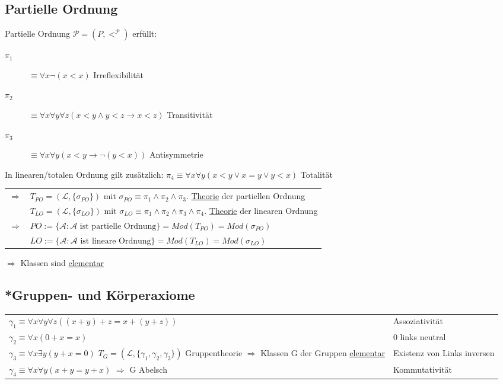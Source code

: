 \documentclass[12pt,a4paper]{article} %
\begin{document}
	\subsection{Partielle Ordnung}
	Partielle Ordnung $\mathcal{P} = (P, <^{\mathcal{P}})$ erfüllt:
	\begin{description}
		\item[$\pi_1$] $\equiv \forall x \neg(x < x)$ Irreflexibilität
		\item[$\pi_2$] $\equiv \forall x \forall y \forall z (x < y \land y < z \rightarrow x < z)$ Transitivität
		\item[$\pi_3$] $\equiv \forall x \forall y (x < y \rightarrow \neg (y < x))$ Antisymmetrie
	\end{description}
	In linearen/totalen Ordnung gilt zusätzlich:\newline
	$\pi_4 \equiv \forall x \forall y (x < y \lor x = y \lor y < x)$ Totalität
	
	\begin{tabular}{l l}
		$\Rightarrow$ & $T_{PO} = (\mathcal{L}, \{\sigma_{PO}\})$ mit $\sigma_{PO} \equiv \pi_1 \land \pi_2 \land \pi_3$. \hyperref[Theorie]{Theorie} der partiellen Ordnung \\
		& $T_{LO} = (\mathcal{L}, \{\sigma_{LO}\})$ mit $\sigma_{LO} \equiv \pi_1 \land \pi_2 \land \pi_3 \land \pi_4$. \hyperref[Theorie]{Theorie} der linearen Ordnung \\
		$\Rightarrow$ & $PO := \{\mathcal{A}: \mathcal{A} \text{ ist partielle Ordnung}\} = Mod(T_{PO}) = Mod(\sigma_{PO})$ \\
		& $LO := \{\mathcal{A}: \mathcal{A} \text{ ist lineare Ordnung}\} = Mod(T_{LO}) = Mod(\sigma_{LO})$
	\end{tabular}
	
	$\Rightarrow$ Klassen sind \hyperref[Elementar]{elementar}

	\subsection{*Gruppen- und Körperaxiome}
	\begin{tabular}{p{7cm} l}
		$\gamma_1 \equiv \forall x \forall y \forall z ((x + y) + z = x + (y + z))$ & Assoziativität \\
		$\gamma_2 \equiv \forall x (0 + x = x)$ & 0 links neutral \\
		$\gamma_3 \equiv \forall x \exists y (y + x = 0)$ \newline $T_G = (\mathcal{L}, \{\gamma_1, \gamma_2, \gamma_3\})$ Gruppentheorie \newline $\Rightarrow$ Klassen G der Gruppen \hyperref[Elementar]{elementar} & Existenz von Links inversen \\
		$\gamma_4 \equiv \forall x \forall y (x + y = y + x)$ \newline $\Rightarrow$ G Abelsch & Kommutativität \\
	\end{tabular}
\end{document}

